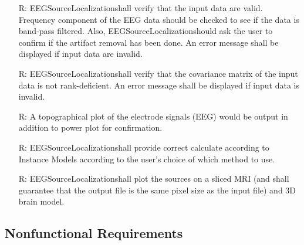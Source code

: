 \documentclass[12pt]{article}
\newcounter{reqnum} %
\renewcommand{\progname}{EEGSourceLocalization}
\begin{document}
\noindent \begin{itemize}

\item[R\refstepcounter{reqnum}\thereqnum \label{R_Inputs}:]  \progname shall verify that the input data are valid. Frequency component of the EEG data should be checked to see if the data is band-pass filtered. Also, \progname should ask the user to confirm if the artifact removal has been done. An error message shall be displayed if input data are invalid.
\item[R\refstepcounter{reqnum}\thereqnum \label{R_Inputs}:]  \progname shall verify that the covariance matrix of the input data is not rank-deficient.  An error message shall be displayed if input data is invalid.

\item[R\refstepcounter{reqnum}\thereqnum \label{R_OutputInputs}:] A topographical plot of the electrode signals (EEG) would be output in addition to power plot for confirmation. 

\item[R\refstepcounter{reqnum}\thereqnum \label{R_Calculate}:] \progname shall provide correct calculate according to Instance Models according to the user’s choice of which method to use.


\item[R\refstepcounter{reqnum}\thereqnum \label{R_Output}:] \progname shall plot the sources on a sliced MRI (and shall guarantee that the output file is the same pixel size as the input file) and 3D brain model.

\end{itemize}

\subsection{Nonfunctional Requirements}

\end{document}

